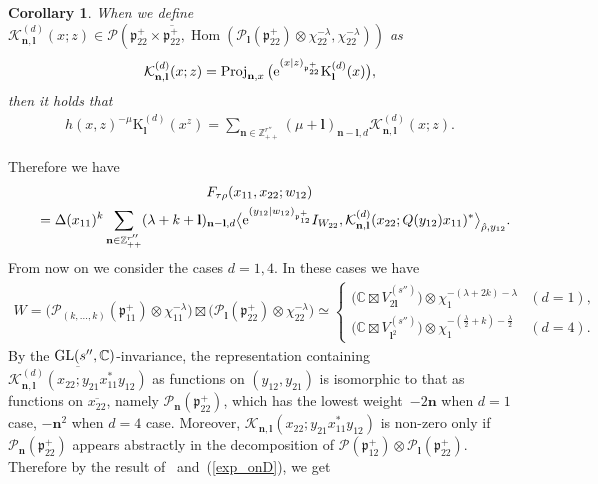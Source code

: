 \documentclass[pdftex]{sigma}
\numberwithin{equation}{section}
\newtheorem{Corollary}[Theorem]{Corollary}
\newcommand{\bl}{\mathbf{l}}
\newcommand{\bn}{\mathbf{n}}
\newcommand{\BZ}{\mathbb{Z}}
\newcommand{\BC}{\mathbb{C}}
\newcommand{\fp}{\mathfrak{p}}
\newcommand{\cK}{\mathcal{K}}
\newcommand{\cP}{\mathcal{P}}
\newcommand{\rK}{\mathrm{K}}
\newcommand{\Hom}{\operatorname{Hom}}
\newcommand{\Proj}{\operatorname{Proj}}
\begin{document}
\begin{Corollary}\label{ext_of_hK}
When we define $\cK_{\bn,\bl}^{(d)}(x;z)\in\cP(\fp^+_{22}\times\overline{\fp^+_{22}},\Hom(\cP_{\bl}(\fp^+_{22})\otimes\chi^{-\lambda}_{22},
\chi^{-\lambda}_{22}))$ as
\begin{gather*} \cK_{\bn,\bl}^{(d)}(x;z)=\Proj_{\bn,x}\big({\rm e}^{(x|z)_{\fp^+_{22}}}\rK_\bl^{(d)}(x)\big), \end{gather*}
then it holds that
\begin{gather*} h(x,z)^{-\mu}\rK_\bl^{(d)}(x^z)=\sum_{\bn\in\BZ_{++}^{r''}}(\mu+\bl)_{\bn-\bl,d}\cK_{\bn,\bl}^{(d)}(x;z). \end{gather*}
\end{Corollary}
Therefore we have
\begin{gather*}
 F_{\tau\rho}(x_{11},x_{22};w_{12}) \\
 \qquad{} =\Delta(x_{11})^k\sum_{\bn\in\BZ_{++}^{r''}}(\lambda+k+\bl)_{\bn-\bl,d}
\bigl\langle {\rm e}^{(y_{12}|w_{12})_{\fp^+_{12}}}I_{W_{22}},
\cK_{\bn,\bl}^{(d)}(x_{22};Q(y_{12})x_{11})^*\bigr\rangle_{\hat{\rho},y_{12}}.
\end{gather*}
From now on we consider the cases $d=1,4$. In these cases we have
\begin{gather*} W=\big(\cP_{(k,\ldots,k)}(\fp^+_{11})\otimes\chi_{11}^{-\lambda}\big)\boxtimes\big(\cP_\bl(\fp^+_{22})\otimes\chi_{22}^{-\lambda}\big)
\simeq\begin{cases} \big(\BC\boxtimes V_{2\bl}^{(s'')}\big)\otimes \chi_1^{-(\lambda+2k)-\lambda} & (d=1), \\
\big(\BC\boxtimes V_{\bl^2}^{(s'')}\big)\otimes \chi_1^{-\left(\frac{\lambda}{2}+k\right)-\frac{\lambda}{2}} & (d=4). \end{cases} \end{gather*}
By the ${\rm GL}(s'',\BC)$-invariance, the representation containing
$\overline{\cK_{\bn,\bl}^{(d)}(x_{22};y_{21}x_{11}^*y_{12})}$ as functions on $(y_{12},y_{21})$ is isomorphic to that
as functions on $\overline{x_{22}}$, namely $\cP_\bn(\fp^+_{22})$, which has the lowest weight~$-2\bn$ when $d=1$ case, $-\bn^2$ when $d=4$ case. Moreover, $\cK_{\bn,\bl}(x_{22};y_{21}x_{11}^*y_{12})$ is non-zero only if~$\cP_\bn(\fp^+_{22})$ appears abstractly in the decomposition of $\cP(\fp^+_{12})\otimes\cP_\bl(\fp^+_{22})$.
Therefore by the result of~\cite{N2} and~(\ref{exp_onD}), we get
\end{document}
